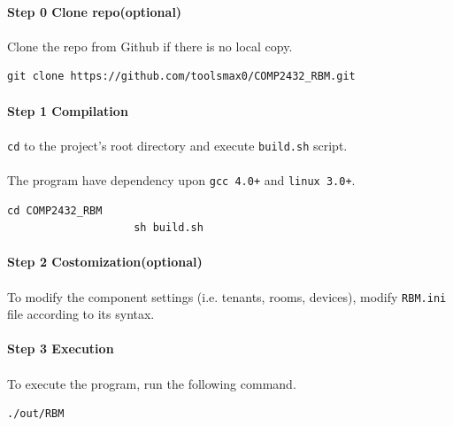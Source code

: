 \documentclass{article}
\begin{document}
            \paragraph{Step 0 Clone repo(optional)}
            \paragraph{}
                Clone the repo from Github if there is no local copy.
                \begin{Verbatim}[gobble=8]
                    git clone https://github.com/toolsmax0/COMP2432_RBM.git
                \end{Verbatim}
            \paragraph{Step 1 Compilation}
            \paragraph{}
                \texttt{cd} to the project's root directory and execute \texttt{build.sh} script.
            \paragraph{}
                The program have dependency upon \texttt{gcc 4.0+} and \texttt{linux 3.0+}.
                \begin{Verbatim}[gobble=8]
                    cd COMP2432_RBM
                    sh build.sh
                \end{Verbatim}
            \paragraph{Step 2 Costomization(optional)}
            \paragraph{}
                To modify the component settings (i.e. tenants, rooms, devices),
                modify \texttt{RBM.ini} file according to its syntax.
            \paragraph{Step 3 Execution}
            \paragraph{}
                To execute the program, run the following command.
                \begin{Verbatim}[gobble=8]
                    ./out/RBM
                \end{Verbatim}
\end{document}
